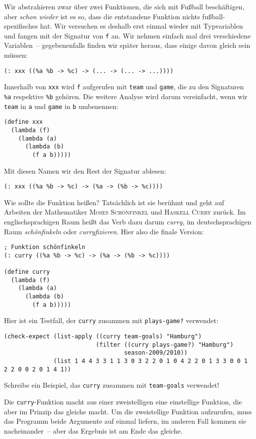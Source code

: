 Wir abstrahieren zwar über zwei Funktionen, die sich mit Fußball
beschäftigen, aber \emph{schon wieder} ist es so, dass die entstandene
Funktion nichts fußball-spezifisches hat.  Wir versuchen es deshalb
erst einmal wieder mit Typvariablen und fangen mit der Signatur von
\lstinline{f} an.  Wir nehmen einfach mal drei verschiedene
Variablen~-- gegebenenfalls finden wir später heraus, dass einige
davon gleich sein müssen:
%
\begin{lstlisting}
(: xxx ((%a %b -> %c) -> (... -> (... -> ...))))
\end{lstlisting}
%
Innerhalb von \lstinline{xxx} wird \lstinline{f} aufgerufen mit
\lstinline{team} und \lstinline{game}, die zu den Signaturen
\lstinline{%a} respektive \lstinline{%b} gehören.  Die weitere Analyse
wird darum vereinfacht, wenn wir \lstinline{team} in \lstinline{a} und
\lstinline{game} in \lstinline{b} umbenennen:
%
\begin{lstlisting}
(define xxx
  (lambda (f)
    (lambda (a)
      (lambda (b)
        (f a b)))))
\end{lstlisting}
%
Mit diesen Namen wir den Rest der Signatur ablesen:
%
\begin{lstlisting}
(: xxx ((%a %b -> %c) -> (%a -> (%b -> %c))))
\end{lstlisting}
%
Wie sollte die Funktion heißen?  Tatsächlich ist sie berühmt und geht
auf Arbeiten der Mathematiker \textsc{Moses Schönfinkel} und
\textsc{Haskell Curry} zurück.  Im englischsprachigen Raum heißt das
Verb dazu darum \textit{curry}, im deutschsprachigen Raum
\textit{schönfinkeln} oder
\textit{curryfizieren}.  Hier also die finale
Version:
%
\begin{lstlisting}
; Funktion schönfinkeln
(: curry ((%a %b -> %c) -> (%a -> (%b -> %c))))

(define curry
  (lambda (f)
    (lambda (a)
      (lambda (b)
        (f a b)))))
\end{lstlisting}
%
Hier ist ein Testfall, der \lstinline{curry} zusammen mit
\lstinline{plays-game?} verwendet:
%
\begin{lstlisting}
(check-expect (list-apply ((curry team-goals) "Hamburg")
                          (filter ((curry plays-game?) "Hamburg")
                                  season-2009/2010))
              (list 1 4 4 3 3 1 1 3 0 3 2 2 0 1 0 4 2 2 0 1 3 3 0 0 1 2 2 0 0 2 0 1 4 1))
\end{lstlisting}
%
\begin{aufgabeinline}
  Schreibe ein Beispiel, das \lstinline{curry} zusammen mit
  \lstinline{team-goals} verwendet!
\end{aufgabeinline}
%
Die \lstinline{curry}-Funktion macht aus einer zweistelligen eine
einstellige Funktion, die aber im Prinzip das gleiche macht. Um die
zweistellige Funktion aufzurufen, muss das Programm beide Argumente
auf einmal liefern, im anderen Fall kommen sie nacheinander~-- aber
das Ergebnis ist am Ende das gleiche.

